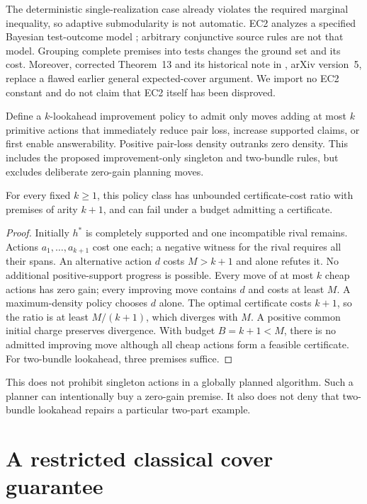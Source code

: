 The deterministic single-realization case already violates the required
marginal inequality, so adaptive submodularity is not automatic. EC2 analyzes
a specified Bayesian test-outcome model \citep{golovin2010ec2}; arbitrary
conjunctive source rules are not that model. Grouping complete premises into
tests changes the ground set and its cost. Moreover, corrected Theorem~13
and its historical note in \citet{golovin2011adaptive}, arXiv version~5,
replace a flawed earlier general expected-cover argument. We import no EC2
constant and do not claim that EC2 itself has been disproved.

Define a $k$-lookahead improvement policy to admit only moves adding at most
$k$ primitive actions that immediately reduce pair loss, increase supported
claims, or first enable answerability. Positive pair-loss density outranks
zero density. This includes the proposed improvement-only singleton and
two-bundle rules, but excludes deliberate zero-gain planning moves.

\begin{proposition}
For every fixed $k\geq1$, this policy class has unbounded certificate-cost
ratio with premises of arity $k+1$, and can fail under a budget admitting a
certificate.
\end{proposition}
\begin{proof}
Initially $h^*$ is completely supported and one incompatible rival remains.
Actions $a_1,\ldots,a_{k+1}$ cost one each; a negative witness for the rival
requires all their spans. An alternative action $d$ costs $M>k+1$ and alone
refutes it. No additional positive-support progress is possible. Every move
of at most $k$ cheap actions has zero gain; every improving move contains
$d$ and costs at least $M$. A maximum-density policy chooses $d$ alone.
The optimal certificate costs $k+1$, so the ratio is at least $M/(k+1)$,
which diverges with $M$. A positive common initial charge preserves divergence.
With budget $B=k+1<M$, there is no admitted improving move although all cheap
actions form a feasible certificate. For two-bundle lookahead, three premises
suffice.
\end{proof}

This does not prohibit singleton actions in a globally planned algorithm.
Such a planner can intentionally buy a zero-gain premise. It also does not
deny that two-bundle lookahead repairs a particular two-part example.

\section{A restricted classical cover guarantee}
\label{sec:alg-cover}

